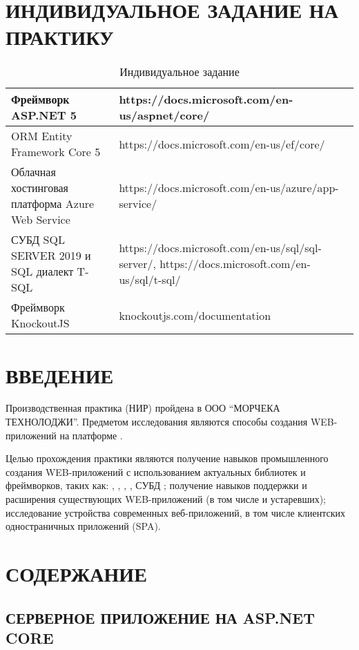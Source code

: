 \documentclass[a4paper,14pt]{extarticle}
\begin{document}
\section{ИНДИВИДУАЛЬНОЕ ЗАДАНИЕ НА ПРАКТИКУ}
\begin{table}[H]
    \caption{Индивидуальное задание}
    \begin{tabular}{ | p{5.5cm} | p{11cm} | }
        \hline
        Фреймворк ASP.NET 5 & https://docs.microsoft.com/en-us/aspnet/core/ \\ \hline
        ORM Entity Framework Core 5 & https://docs.microsoft.com/en-us/ef/core/ \\ \hline
        Облачная хостинговая платформа Azure Web Service & https://docs.microsoft.com/en-us/azure/app-service/ \\ \hline
        СУБД SQL SERVER 2019 и SQL диалект T-SQL & https://docs.microsoft.com/en-us/sql/sql-server/, https://docs.microsoft.com/en-us/sql/t-sql/ \\ \hline
        Фреймворк KnockoutJS & knockoutjs.com/documentation \\ \hline
    \end{tabular}
\end{table}
\pagebreak

\section{ВВЕДЕНИЕ}
Производственная практика (НИР) пройдена в ООО \enquote{МОРЧЕКА ТЕХНОЛОДЖИ}. Предметом
исследования являются способы создания WEB-приложений на платформе .

Целью прохождения практики являются получение навыков промышленного создания
WEB-приложений с использованием актуальных библиотек и фреймворков, таких как:
, , , ,
СУБД ; получение навыков поддержки и расширения существующих
WEB-приложений (в том числе и устаревших); исследование устройства современных
веб-приложений, в том числе клиентских одностраничных приложений (SPA).
\pagebreak

\tableofcontents
\pagebreak

\section{СОДЕРЖАНИЕ}
\subsection{СЕРВЕРНОЕ ПРИЛОЖЕНИЕ НА ASP.NET CORE}
\end{document}
